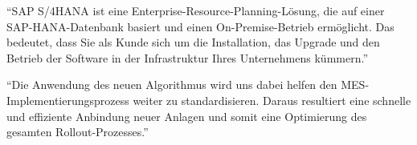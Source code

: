 \documentclass[12pt, a4paper]{report}
\begin{document}

{\small
\enquote{SAP S/4HANA ist eine Enterprise-Resource-Planning-Lösung, die auf einer \linebreak
SAP-HANA-Datenbank basiert und einen On-Premise-Betrieb ermöglicht. Das bedeutet, dass Sie als Kunde sich um die Installation, das Upgrade und den Betrieb der Software in der Infrastruktur Ihres Unternehmens kümmern.}
}


{\small
\enquote{Die Anwendung des neuen Algorithmus wird uns dabei helfen den MES-Implementierungsprozess weiter zu standardisieren. Daraus resultiert eine schnelle und effiziente Anbindung neuer Anlagen und somit eine Optimierung des gesamten Rollout-Prozesses.}}
\end{document}
